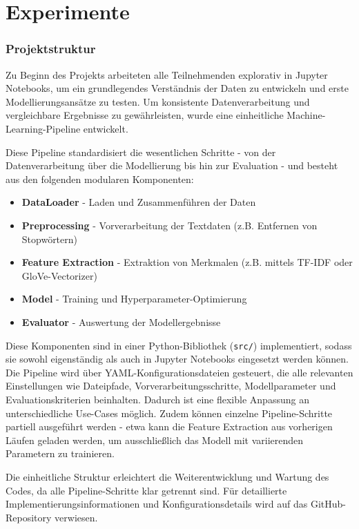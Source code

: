 \section{Experimente}

\subsubsection{Projektstruktur}
\label{sec:projektstruktur}
Zu Beginn des Projekts arbeiteten alle Teilnehmenden explorativ in Jupyter Notebooks, um ein grundlegendes Verständnis der Daten zu entwickeln und erste Modellierungsansätze zu testen. Um konsistente Datenverarbeitung und vergleichbare Ergebnisse zu gewährleisten, wurde eine einheitliche Machine-Learning-Pipeline entwickelt.

Diese Pipeline standardisiert die wesentlichen Schritte - von der Datenverarbeitung über die Modellierung bis hin zur Evaluation - und besteht aus den folgenden modularen Komponenten:

\begin{itemize}
    \item \textbf{DataLoader} - Laden und Zusammenführen der Daten
    \item \textbf{Preprocessing} - Vorverarbeitung der Textdaten (z.B. Entfernen von Stopwörtern)
    \item \textbf{Feature Extraction} - Extraktion von Merkmalen (z.B. mittels TF-IDF oder GloVe-Vectorizer)
    \item \textbf{Model} - Training und Hyperparameter-Optimierung
    \item \textbf{Evaluator} - Auswertung der Modellergebnisse
\end{itemize}

Diese Komponenten sind in einer Python-Bibliothek (\texttt{src/}) implementiert, sodass sie sowohl eigenständig als auch in Jupyter Notebooks eingesetzt werden können. Die Pipeline wird über YAML-Konfigurationsdateien gesteuert, die alle relevanten Einstellungen wie Dateipfade, Vorverarbeitungsschritte, Modellparameter und Evaluationskriterien beinhalten. Dadurch ist eine flexible Anpassung an unterschiedliche Use-Cases möglich. Zudem können einzelne Pipeline-Schritte partiell ausgeführt werden - etwa kann die Feature Extraction aus vorherigen Läufen geladen werden, um ausschließlich das Modell mit variierenden Parametern zu trainieren.

Die einheitliche Struktur erleichtert die Weiterentwicklung und Wartung des Codes, da alle Pipeline-Schritte klar getrennt sind. Für detaillierte Implementierungsinformationen und Konfigurationsdetails wird auf das GitHub-Repository verwiesen.


